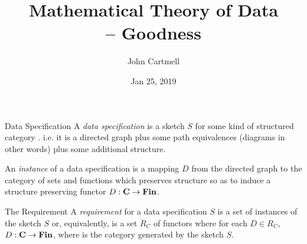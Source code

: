 \documentclass[xcolor=pst,dvips]{beamer}   %
\title[John Cartmell]{Mathematical Theory of Data \\ -- Goodness}
\author{John Cartmell}
\institute{Ad Otium}
\date{Jan 25, 2019}
\begin{document}
\begin{frame}
\titlepage
\end{frame}

\iffalse
\begin{frame}{Introduction}
\begin{itemize}
\item
What types of things are there and how are they related? 
\begin{itemize}
\pause \item Data specifications provide the answer to this question in the context of a software development. 
\pause \item Types theories provide the answer in the context of mathematics. 
\pause \item Category theory abstracts across both these domains.
\end{itemize}
\end{itemize}
\end{frame}
\fi

\begin{frame}{Data Specification}
A \textit{data specification} is a sketch $S$ for some kind of structured category \catc.
i.e. it is a directed graph plus some path equivalences (diagrams in other words) plus 
some additional structure.  

An \textit{instance} of a data specification is a mapping $D$ from the directed graph
to the category of sets and functions which preserves structure so as
to induce a structure preserving functor $D: \textbf{C} \rightarrow \textbf{Fin}$.
\end{frame}

\begin{frame}{The Requirement}
A \textit{requirement} for a data specification $S$ 
is a set of instances of the sketch $S$ or, equivalently, is a set $R_C$ of functors where for each
$D \in R_C$, $D: \textbf{C} \rightarrow \textbf{Fin}$, where \catcw is the category generated by the sketch $S$.
\end{frame}
\end{document}

